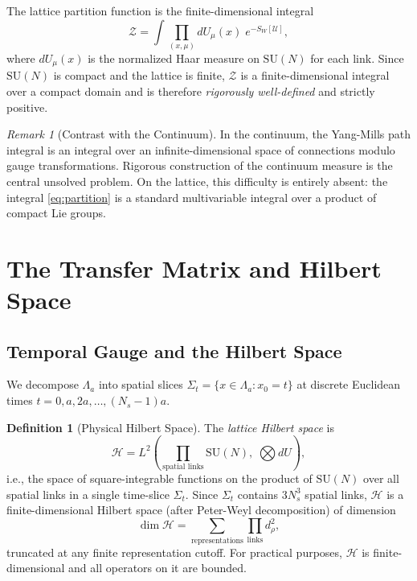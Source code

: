 \documentclass[12pt, a4paper]{article}
\theoremstyle{plain}
\theoremstyle{definition}
\newtheorem{definition}[theorem]{Definition}
\theoremstyle{remark}
\newtheorem{remark}[theorem]{Remark}
\newcommand{\SU}{\mathrm{SU}}
\newcommand{\calH}{\mathcal{H}}
\newcommand{\calZ}{\mathcal{Z}}
\begin{document}
The lattice partition function is the finite-dimensional integral
\begin{equation}\label{eq:partition}
  \calZ = \int \prod_{(x,\mu)} dU_\mu(x) \; e^{-S_W[\mathcal{U}]},
\end{equation}
where $dU_\mu(x)$ is the normalized Haar measure on $\SU(N)$ for each link.
Since $\SU(N)$ is compact and the lattice is finite, $\calZ$ is a
finite-dimensional integral over a compact domain and is therefore
\emph{rigorously well-defined} and strictly positive.

\begin{remark}[Contrast with the Continuum]
  In the continuum, the Yang-Mills path integral is an integral over an
  infinite-dimensional space of connections modulo gauge transformations.
  Rigorous construction of the continuum measure is the central
  unsolved problem. On the lattice, this difficulty is entirely absent:
  the integral \eqref{eq:partition} is a standard multivariable integral
  over a product of compact Lie groups.
\end{remark}

\section{The Transfer Matrix and Hilbert Space}\label{sec:transfer}

\subsection{Temporal Gauge and the Hilbert Space}

We decompose $\Lambda_a$ into spatial slices $\Sigma_t = \{x \in \Lambda_a :
x_0 = t\}$ at discrete Euclidean times $t = 0, a, 2a, \ldots, (N_s-1)a$.

\begin{definition}[Physical Hilbert Space]\label{def:hilbert}
  The \emph{lattice Hilbert space} is
  \begin{equation}
    \calH = L^2\!\left(\prod_{\text{spatial links}} \SU(N), \;
    \bigotimes dU\right),
  \end{equation}
  i.e., the space of square-integrable functions on the product of $\SU(N)$
  over all spatial links in a single time-slice $\Sigma_t$. Since $\Sigma_t$
  contains $3 N_s^3$ spatial links, $\calH$ is a finite-dimensional Hilbert
  space (after Peter-Weyl decomposition) of dimension
  \begin{equation}
    \dim \calH = \sum_{\text{representations}} \prod_{\text{links}} d_\rho^2,
  \end{equation}
  truncated at any finite representation cutoff. For practical purposes,
  $\calH$ is finite-dimensional and all operators on it are bounded.
\end{definition}
\end{document}
